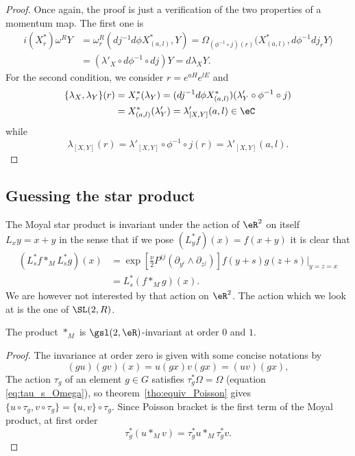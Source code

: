 \begin{proof}
Once again, the proof is just a verification of the two properties of a momentum map. The first one is
\begin{equation}
\begin{split}
  i(X^*_r)\omega^R Y&=\omega^R_r(dj^{-1} d\phi X^*_{(a,l)},Y)
        =\Omega_{(\phi^{-1}\circ j)(r)}\big( X^*_{(a,l)},d\phi^{-1} dj_r Y \big)\\
        &=(\lambda'_X\circ d\phi^{-1}\circ dj)Y
        =d\lambda_X Y.
\end{split}
\end{equation}
For the second condition, we consider $r=e^{aH}e^{lE}$ and
\begin{equation}
\begin{split}
  \{ \lambda_X,\lambda_Y \}(r)&=X^*_r(\lambda_Y)
        =(dj^{-1} d\phi X^*_{(a,l)})(\lambda'_Y\circ \phi^{-1}\circ j)\\
        &=X^*_{(a,l)}(\lambda'_Y)
        =\lambda'_{[X,Y]}(a,l)\in\eC
\end{split}
\end{equation}
while
\[
  \lambda_{[X,Y]}(r)=\lambda'_{[X,Y]}\circ\phi^{-1}\circ j(r)=\lambda'_{[X,Y]}(a,l).
\]
\end{proof}

\subsection{Guessing the star product}

The Moyal star product is invariant under the action of $\eR^2$ on itself $L_xy=x+y$ in the sense that if we pose $(L_y^*f)(x)=f(x+y)$ it is clear that
\begin{equation}
\begin{split}
    (L_s^*f\ast_M L_s^*g)(x)&=
    \exp\left[{\displaystyle\frac{\nu}{2}P^{ij}(\partial_{y^i}\wedge\partial_{z^j})}\right]f(y+s)g(z+s)|_{y=z=x}\\
                        &=L^*_s(f\ast_M g)(x).
\end{split}
\end{equation}
We are however not interested by that action on $\eR^2$. The action which we look at is the one of $\SL(2,R)$.

\begin{proposition}
The product $\ast_M$ is $\gsl(2,\eR)$-invariant at order $0$ and $1$.
\end{proposition}

\begin{proof}
The invariance at order zero is given with some concise notations by
\[
 (gu)(gv)(x)=u(gx)v(gx)=(uv)(gx),
\]
The action $\tau_g$ of an element $g\in G$ satisfies $\tau_g^*\Omega=\Omega$ (equation \eqref{eq:tau_s_Omega}), so  theorem~\ref{tho:equiv_Poisson} gives $\{u\circ\tau_g,v\circ\tau_g\}=\{u,v\}\circ\tau_g$.  Since Poisson bracket is the first term of the Moyal product, at first order
\[
  \tau_g^*(u\ast_M v)=\tau_g^*u\ast_M\tau_g^*v.
\]


\end{proof}

